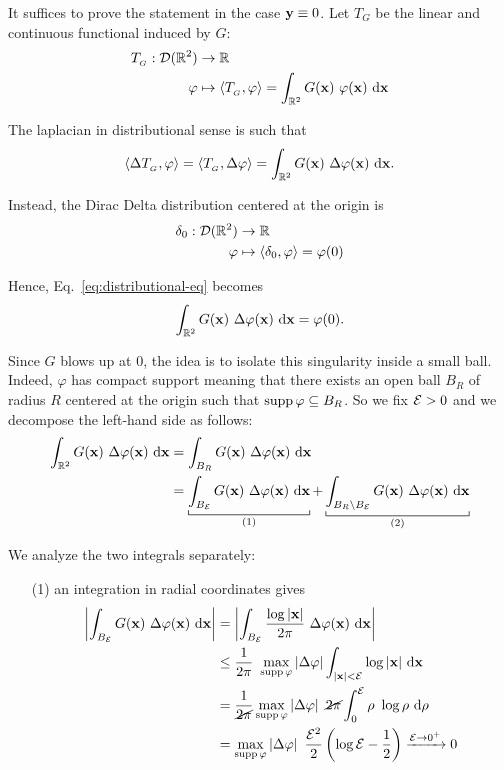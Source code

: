 \begin{demo}
It suffices to prove the statement in the case $\mathbf{y}\equiv 0$. Let $T_G$ be the linear and continuous functional induced by $G$:
\begin{align*}
T_{_G}:\Dc(\RR^2)&\to\RR \\
\varphi&\mapsto \sca{T_{_G},\varphi}=\int_{\RR^2} G(\xv)\ \varphi(\xv)\dxv
\end{align*}

The laplacian in distributional sense is such that
\begin{equation*}
\sca{\Delta T_{_G},\varphi}=\sca{T_{_G},\Delta\varphi}=\int_{\RR^2} G(\xv)\ \Delta\varphi(\xv)\dxv.
\end{equation*}

Instead, the Dirac Delta distribution centered at the origin is
\begin{align*}
\delta_0:\mathcal{D}(\mathbb{R}^2)&\to\mathbb{R} \\
\varphi&\mapsto \left\langle \delta_0,\varphi \right\rangle=\varphi(0)
\end{align*}

Hence, Eq.~\eqref{eq:distributional-eq} becomes
\begin{equation}
\label{eq:distributional-integral}
\int_{\mathbb{R}^2} G(\mathbf{x})\ \Delta\varphi(\mathbf{x})\  \mathrm{d} \mathbf{x}=\varphi(0).
\end{equation}

Since $G$ blows up at $0$, the idea is to isolate this singularity inside a small ball. Indeed, $\varphi$ has compact support meaning that there exists an open ball $B_R$ of radius $R$ centered at the origin such that $\operatorname{supp}\varphi\subseteq B_R$. So we fix $\mathcal{E}>0$ and we decompose the left-hand side as follows:
\begin{align*}
\int_{\RR^2} G(\xv)\ \Delta\varphi(\xv)\dxv&=\int_{B_R} G(\xv)\ \Delta\varphi(\xv)\dxv \\
&= \underbracket[0.5pt]{\int_{B_\Ec} G(\xv)\ \Delta\varphi(\xv)\dxv }_{(1)}+ \underbracket[0.5pt]{\int_{B_R\setminus{B_\Ec}} G(\xv)\ \Delta\varphi(\xv)\dxv}_{(2)}
\end{align*}

We analyze the two integrals separately:
\begin{enumerate}
\item[(1)] an integration in radial coordinates gives
\begin{equation*}
\begin{aligned}
\left| \int_{B_{\mathcal{E}}} G(\mathbf{x})\ \Delta\varphi(\mathbf{x})\  \mathrm{d} \mathbf{x} \right|&=\left| \int_{B_{\mathcal{E}}} \frac{\log|\mathbf{x}|}{2\pi} \ \Delta\varphi(\mathbf{x})\  \mathrm{d} \mathbf{x} \right| \\
&\leq \frac{1}{2\pi}\  \max_{\operatorname{supp}\varphi}\left| \Delta\varphi \right| \int_{|\mathbf{x}|<\mathcal{E}} \log|\mathbf{x}| \  \mathrm{d} \mathbf{x} \\
&=\frac{1}{\cancel{2\pi}}\max_{\operatorname{supp}\varphi}\left| \Delta\varphi \right|\ \cancel{2\pi} \int_{0}^{\mathcal{E}}\rho\ \log\rho\  \mathrm{d} \rho \\
&=\max_{\operatorname{supp}\varphi}\left| \Delta\varphi \right|\ \frac{\mathcal{E}^2}{2} \left( \log\mathcal{E}- \frac{1}{2}  \right) \xrightarrow{\mathcal{E}\to0^+}0
\end{aligned}
\end{equation*}


\end{enumerate}
\end{demo}
